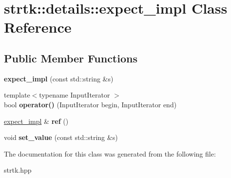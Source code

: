 \hypertarget{classstrtk_1_1details_1_1expect__impl}{\section{strtk\-:\-:details\-:\-:expect\-\_\-impl Class Reference}
\label{classstrtk_1_1details_1_1expect__impl}
}
\subsection*{Public Member Functions}
\begin{DoxyCompactItemize}
\item 
\hypertarget{classstrtk_1_1details_1_1expect__impl_a8902934f4f807b04437290520f7253a3}{{\bfseries expect\-\_\-impl} (const std\-::string \&s)}\label{classstrtk_1_1details_1_1expect__impl_a8902934f4f807b04437290520f7253a3}

\item 
\hypertarget{classstrtk_1_1details_1_1expect__impl_a1496b3d105a07b82055ee81ca70e7772}{{\footnotesize template$<$typename Input\-Iterator $>$ }\\bool {\bfseries operator()} (Input\-Iterator begin, Input\-Iterator end)}\label{classstrtk_1_1details_1_1expect__impl_a1496b3d105a07b82055ee81ca70e7772}

\item 
\hypertarget{classstrtk_1_1details_1_1expect__impl_aa1bd270988a87d7f5b4a3e1f94e426cd}{\hyperlink{classstrtk_1_1details_1_1expect__impl}{expect\-\_\-impl} \& {\bfseries ref} ()}\label{classstrtk_1_1details_1_1expect__impl_aa1bd270988a87d7f5b4a3e1f94e426cd}

\item 
\hypertarget{classstrtk_1_1details_1_1expect__impl_abd7d7f9595bba5a9be009516de67cc23}{void {\bfseries set\-\_\-value} (const std\-::string \&s)}\label{classstrtk_1_1details_1_1expect__impl_abd7d7f9595bba5a9be009516de67cc23}

\end{DoxyCompactItemize}


The documentation for this class was generated from the following file\-:\begin{DoxyCompactItemize}
\item 
strtk.\-hpp\end{DoxyCompactItemize}
